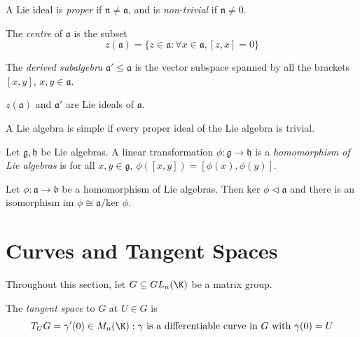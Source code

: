 A Lie ideal is {\it proper} if \(\mathfrak{n}\ne\mathfrak{a}\), and is {\it non-trivial}
if \(\mathfrak{n}\ne 0\).

\begin{definition}
  The {\it centre} of \(\mathfrak{a}\) is the subset
  \[ z(\mathfrak{a})=\{z\in\mathfrak{a}:\forall x\in\mathfrak{a}, [z,x]=0\} \]
\end{definition}

\begin{definition}
  The {\it derived subalgebra} \(\mathfrak{a}'\le\mathfrak{a}\) is the vector subspace
  spanned by all the brackets \([x,y]\), \(x,y\in\mathfrak{a}\).
\end{definition}

\begin{proposition}
  \(z(\mathfrak{a})\) and \(\mathfrak{a}'\) are Lie ideals of \(\mathfrak{a}\).
\end{proposition}

\begin{definition}
  A Lie algebra is simple if every proper ideal of the Lie algebra is trivial.
\end{definition}

\begin{definition}
  Let \(\mathfrak{g},\mathfrak{h}\) be Lie algebras. A linear transformation \(\phi:\mathfrak{g}\longrightarrow\mathfrak{h}\)
  is a {\it homomorphism of Lie algebras} is for all \(x,y\in\mathfrak{g}\),
  \(\phi([x,y])=[\phi(x),\phi(y)]\).
\end{definition}

\begin{proposition}
  Let \(\phi:\mathfrak{a}\longrightarrow\mathfrak{b}\) be a homomorphism of Lie algebras. Then
  \(\text{ker }\phi\vartriangleleft\mathfrak{a}\) and there is an isomorphism \(\text{im }\phi\cong\mathfrak{a}/\text{ker }\phi\).
\end{proposition}

\section{Curves and Tangent Spaces}

Throughout this section, let \(G\subseteq GL_n(\K)\) be a matrix group.

\begin{definition}
  The {\it tangent space} to \(G\) at \(U\in G\) is
  \[ T_UG={\gamma'(0)\in M_n(\K):\gamma\text{ is a differentiable curve in }G\text{ with }\gamma(0)=U} \]
\end{definition}

